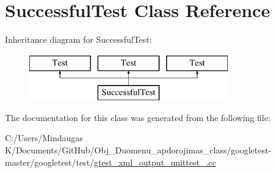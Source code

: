 \hypertarget{class_successful_test}{}\section{Successful\+Test Class Reference}
\label{class_successful_test}
Inheritance diagram for Successful\+Test\+:\begin{figure}[H]
\begin{center}
\leavevmode
\includegraphics[height=2.000000cm]{d8/ddd/class_successful_test}
\end{center}
\end{figure}


The documentation for this class was generated from the following file\+:\begin{DoxyCompactItemize}
\item 
C\+:/\+Users/\+Mindaugas K/\+Documents/\+Git\+Hub/\+Obj\+\_\+\+Duomenu\+\_\+apdorojimas\+\_\+class/googletest-\/master/googletest/test/\mbox{\hyperlink{googletest-master_2googletest_2test_2gtest__xml__output__unittest___8cc}{gtest\+\_\+xml\+\_\+output\+\_\+unittest\+\_\+.\+cc}}\end{DoxyCompactItemize}
